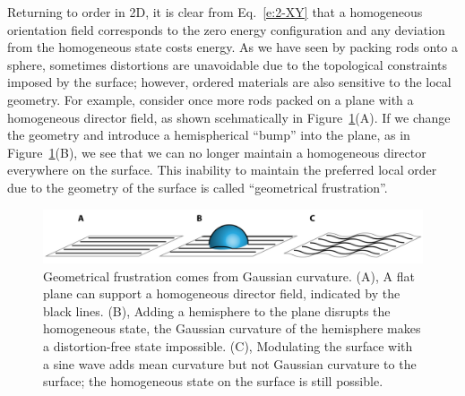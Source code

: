 Returning to order in 2D, it is clear from Eq.~\ref{e:2-XY} that a homogeneous orientation field corresponds to the zero energy configuration and any deviation from the homogeneous state costs energy.
As we have seen by packing rods onto a sphere, sometimes distortions are unavoidable due to the topological constraints imposed by the surface; however, ordered materials are also sensitive to the local geometry.
For example, consider once more rods packed on a plane with a homogeneous director field, as shown scehmatically in Figure~\ref{f:1-ParallelTransport}(A).
If we change the geometry and introduce a hemispherical ``bump'' into the plane, as in Figure~\ref{f:1-ParallelTransport}(B), we see that we can no longer maintain a homogeneous director everywhere on the surface.
This inability to maintain the preferred local order due to the geometry of the surface is called ``geometrical frustration''.
\begin{figure}
  \centering
  \includegraphics{figures/C1/Ch1-Figs_ParallelTransport.png}
  \caption{Geometrical frustration comes from Gaussian curvature.
  (A), A flat plane can support a homogeneous director field, indicated by the black lines.
  (B), Adding a hemisphere to the plane disrupts the homogeneous state, the Gaussian curvature of the hemisphere makes a distortion-free state impossible.
  (C), Modulating the surface with a sine wave adds mean curvature but not Gaussian curvature to the surface; the homogeneous state on the surface is still possible.}\label{f:1-ParallelTransport}
\end{figure}

